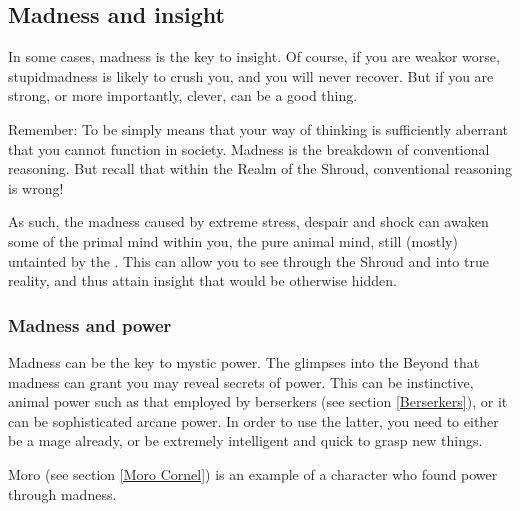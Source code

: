 \subsection{Madness and insight}
In some cases, madness is the key to insight. Of course, if you are weak\dash or worse, stupid\dash madness is likely to crush you, and you will never recover. But if you are strong, or more importantly, clever,  can be a good thing.

Remember: To be  simply means that your way of thinking is sufficiently aberrant that you cannot function in society. Madness is the breakdown of conventional reasoning. But recall that within the Realm of the Shroud, conventional reasoning is wrong! 

As such, the madness caused by extreme stress, despair and shock can awaken some of the primal mind within you, the pure animal mind, still (mostly) untainted by the . This can allow you to see through the Shroud and into true reality, and thus attain insight that would be otherwise hidden. 






\subsubsection{Madness and power}
Madness can be the key to mystic power. The glimpses into the Beyond that madness can grant you may reveal secrets of power. This can be instinctive, animal power such as that employed by berserkers (see section \ref{Berserkers}), or it can be sophisticated arcane power. In order to use the latter, you need to either be a mage already, or be extremely intelligent and quick to grasp new things. 

Moro \Cornel{} (see section \ref{Moro Cornel}) is an example of a character who found power through madness. 


